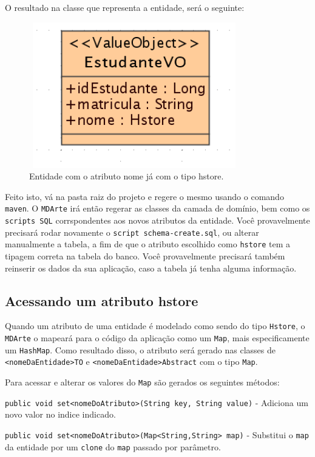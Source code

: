 O resultado na classe que representa a entidade, será o seguinte:
\begin{figure}[H]
	\centering
	\includegraphics[width=260pt,height=180pt]{files/imgs/hstore-0001.png}
	\caption{Entidade com o atributo nome já com o tipo hstore.}
	\label{config_parametro}
\end{figure}

Feito isto, vá na pasta raiz do projeto e regere o mesmo usando o comando
\texttt{maven}. O \texttt{MDArte} irá então regerar as classes da camada de
domínio, bem como os \texttt{scripts SQL} corrspondentes aos novos atributos da
entidade. Você provavelmente precisará rodar novamente o \texttt{script
schema-create.sql}, ou alterar manualmente a tabela, a fim de que o atributo
escolhido como \texttt{hstore} tem a tipagem correta na tabela do banco. Você
provavelmente precisará também reinserir os dados da sua aplicação, caso a
tabela já tenha alguma informação.

\subsection{Acessando um atributo hstore}
Quando um atributo de uma entidade é modelado como sendo do tipo
\texttt{Hstore}, o \texttt{MDArte} o mapeará para o código da aplicação como um
\texttt{Map}, mais especificamente um \texttt{HashMap}. Como resultado disso, o
atributo será gerado nas classes de \texttt{<nomeDaEntidade>TO} e
\texttt{<nomeDaEntidade>Abstract} com o tipo \texttt{Map}.

Para acessar e alterar os valores do \texttt{Map} são gerados os seguintes
métodos:

\texttt{public void set<nomeDoAtributo>(String key, String value)} - Adiciona um
novo valor no indice indicado.

\texttt{public void set<nomeDoAtributo>(Map<String,String> map)} - Substitui o
\texttt{map} da entidade por um \texttt{clone} do \texttt{map} passado por
parâmetro.

